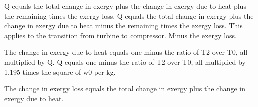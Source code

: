 Q equals the total change in exergy plus the change in exergy due to heat plus the remaining times the exergy loss. 
Q equals the total change in exergy plus the change in exergy due to heat minus the remaining times the exergy loss.
This applies to the transition from turbine to compressor.
Minus the exergy loss.

The change in exergy due to heat equals one minus the ratio of T2 over T0, all multiplied by Q.
Q equals one minus the ratio of T2 over T0, all multiplied by 1.195 times the square of w0 per kg.

The change in exergy loss equals the total change in exergy plus the change in exergy due to heat.